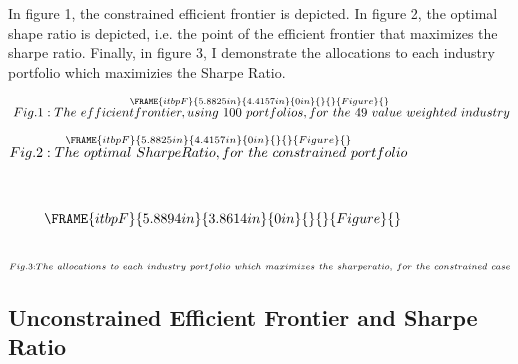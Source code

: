 \documentclass{article}
\begin{document}
In figure 1, the constrained efficient frontier is depicted. In figure 2,
the optimal shape ratio is depicted, i.e. the point of the efficient
frontier that maximizes the sharpe ratio. Finally, in figure 3, I
demonstrate the allocations to each industry portfolio which maximizies the
Sharpe Ratio.

\bigskip \qquad $\overset{\FRAME{itbpF}{5.8825in}{4.4157in}{0in}{}{}{Figure}{%
\special{language "Scientific Word";type "GRAPHIC";maintain-aspect-ratio
TRUE;display "USEDEF";valid_file "T";width 5.8825in;height 4.4157in;depth
0in;original-width 5.8228in;original-height 4.3647in;cropleft "0";croptop
"1";cropright "1";cropbottom "0";tempfilename
'P4KGEQ00.wmf';tempfile-properties "XPR";}}}{\
Fig.1:The~efficientfrontier,using~100~portfolios,for~the~49~value~weighted~industry%
}$\qquad \qquad \qquad \qquad \qquad \qquad

\qquad \qquad \qquad \qquad \qquad \qquad \qquad \qquad \qquad \qquad \qquad
\qquad \qquad \qquad \qquad \qquad \qquad \qquad

\bigskip \qquad $\overset{\FRAME{itbpF}{5.8825in}{4.4157in}{0in}{}{}{Figure}{%
\special{language "Scientific Word";type "GRAPHIC";maintain-aspect-ratio
TRUE;display "USEDEF";valid_file "T";width 5.8825in;height 4.4157in;depth
0in;original-width 5.8228in;original-height 4.3647in;cropleft "0";croptop
"1";cropright "1";cropbottom "0";tempfilename
'P4KGGR01.wmf';tempfile-properties "XPR";}}}{Fig.2:The\
optimal~SharpeRatio,for~the~constrained~portfolio}$\qquad \qquad \qquad
\qquad \qquad \qquad

\qquad \qquad \qquad \qquad \qquad \qquad \qquad \qquad \qquad \qquad \qquad
\qquad \qquad \qquad \qquad \qquad \qquad\ 

\ \ \ \ \ $\FRAME{itbpF}{5.8894in}{3.8614in}{0in}{}{}{Figure}{\special%
{language "Scientific Word";type "GRAPHIC";maintain-aspect-ratio
TRUE;display "USEDEF";valid_file "T";width 5.8894in;height 3.8614in;depth
0in;original-width 11.3057in;original-height 7.4028in;cropleft "0";croptop
"1";cropright "1";cropbottom "0";tempfilename
'P4KI2X02.bmp';tempfile-properties "XP";}}$\ \ \ \ \ \ \ \ \ \ \ \ \ \ \ \ \
\ \ \ \ \ \ \ \ \ \ \ \ \ \ \ \ \ \ \ \ \ \ \ \ \ \ \ \ \ \ \ \ \ \ \ \ \ \
\ \ \ \ \ \ \ 

$\overset{%
Fig.3:The~allocations~to~each~industry~portfolio~which~maximizes~the~sharperatio,~for~the~constrained~case%
}{}$

\subsection{Unconstrained Efficient Frontier and Sharpe Ratio}
\end{document}
